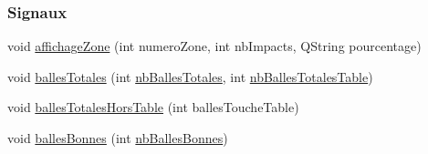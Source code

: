 \subsubsection*{Signaux}
\begin{DoxyCompactItemize}
\item 
void \hyperlink{class_statistiques_seance_a956ac10424a167d5b64fe13a92fbf121}{affichage\+Zone} (int numero\+Zone, int nb\+Impacts, Q\+String pourcentage)
\item 
void \hyperlink{class_statistiques_seance_ac3c52002d12dd7b93e6339126c84190f}{balles\+Totales} (int \hyperlink{class_statistiques_seance_a27eb3965bbe304700d3254534c5e4ed3}{nb\+Balles\+Totales}, int \hyperlink{class_statistiques_seance_aa152a6f154cc832c3355342ecf94162a}{nb\+Balles\+Totales\+Table})
\item 
void \hyperlink{class_statistiques_seance_a02a327f2a69eed4208b7b2076c6a67f2}{balles\+Totales\+Hors\+Table} (int balles\+Touche\+Table)
\item 
void \hyperlink{class_statistiques_seance_aa3ee6b00dae44d1f3cf78349ba235b08}{balles\+Bonnes} (int \hyperlink{class_statistiques_seance_af62043be598fd6b7cd7ddbc37eadf967}{nb\+Balles\+Bonnes})
\end{DoxyCompactItemize}
